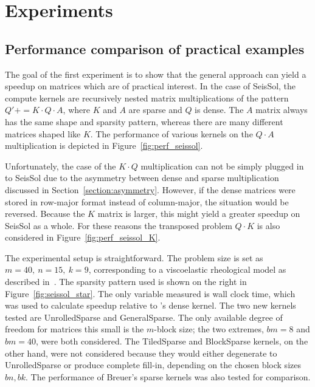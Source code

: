 
\chapter{Experiments}
\label{chapter:experiments}


\section{Performance comparison of practical examples}
\label{section:exp_seissol_star}

The goal of the first experiment is to show that the general approach can yield a speedup on matrices which are of practical interest. In the case of SeisSol, the compute kernels are recursively nested matrix multiplications of the pattern $Q' \mathrel{{+}{=}} K \cdot Q \cdot A$, where $K$ and $A$ are sparse and $Q$ is dense. The $A$ matrix always has the same shape and sparsity pattern, whereas there are many different matrices shaped like $K$. The performance of various kernels on the $Q \cdot A$ multiplication is depicted in Figure~\ref{fig:perf_seissol}. 

Unfortunately, the case of the $K \cdot Q$ multiplication can not be simply plugged in to SeisSol due to the asymmetry between dense and sparse multiplication discussed in Section~\ref{section:asymmetry}. However, if the dense matrices were stored in row-major format instead of column-major, the situation would be reversed. Because the $K$ matrix is larger, this might yield a greater speedup on SeisSol as a whole. For these reasons the transposed problem $Q \cdot K$ is also considered in Figure~\ref{fig:perf_seissol_K}.


The experimental setup is straightforward. The problem size is set as $m=40,~n=15,~k=9$, corresponding to a viscoelastic rheological model as described in~\cite{7568431}. The sparsity pattern used is shown on the right in Figure~\ref{fig:seissol_star}. The only variable measured is wall clock time, which was used to calculate speedup relative to 's dense kernel. The two new kernels tested are UnrolledSparse and GeneralSparse. The only available degree of freedom for matrices this small is the $m$-block size; the two extremes, $bm=8$ and $bm=40$, were both considered. The TiledSparse and BlockSparse kernels, on the other hand, were not considered because they would either degenerate to UnrolledSparse or produce complete fill-in, depending on the chosen block sizes $bn, bk$. The performance of Breuer's sparse kernels was also tested for comparison. 



